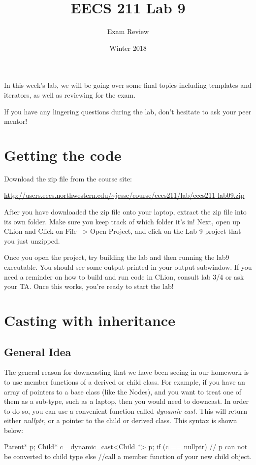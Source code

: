 \documentclass{tufte-handout}
\title{EECS 211 Lab 9}
\author{Exam Review}
\date{Winter 2018}
\begin{document}
\maketitle

In this week's lab, we will be going over some final topics including templates and iterators, as well as reviewing for the exam.


If you have any lingering questions during the lab, don't hesitate to ask your peer mentor!
\section{Getting the code}
Download the zip file from the course site: \medskip

\url{http://users.eecs.northwestern.edu/~jesse/course/eecs211/lab/eecs211-lab09.zip}

\medskip \noindent
After you have downloaded the zip file onto your laptop, extract the zip file into its own folder. Make sure you keep track of which folder it's in!  Next, open up CLion and Click on File --> Open Project, and click on the Lab 9 project that you just unzipped. 

Once you open the project, try building the lab and then running the lab9 executable. 
You should see some output printed in your output subwindow.
If you need a reminder on how to build and run code in CLion, consult lab 3/4 or ask your TA.
Once this works, you're ready to start the lab!

\section{Casting with inheritance}

\subsection {General Idea}
The general reason for downcasting that we have been seeing in our homework is to use member functions of a derived or child class. 
For example, if you have an array of pointers to a base class (like the Nodes), and you want to treat one of them as a sub-type, such as a laptop, then you would need to downcast.
In order to do so, you can use a convenient function called \textit{dynamic cast}. 
This will return either \textit{nullptr}, or a pointer to the child or derived class.  
This syntax is shown below:


\begin{Code}
Parent* p;
Child* c= dynamic_cast<Child *> p; 
if (c == nullptr) {
    // p can not be converted to child type
} else {
    //call a member function of your new child object.
}
\end{Code}
\end{document}
